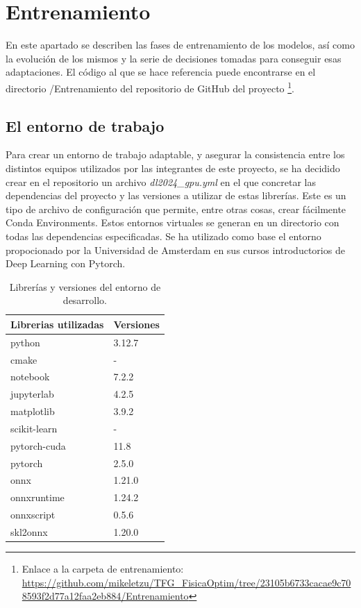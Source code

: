 \section{Entrenamiento}
\label{sec:EntrenamientoPython}

En este apartado se describen las fases de entrenamiento de los modelos, así como la evolución de los mismos y la serie de decisiones tomadas para conseguir esas adaptaciones. El código al que se hace referencia puede encontrarse en el directorio /Entrenamiento del repositorio de GitHub del proyecto \footnote{Enlace a la carpeta de entrenamiento: \url{https://github.com/mikeletzu/TFG_FisicaOptim/tree/23105b6733cacae9c708593f2d77a12faa2eb884/Entrenamiento}}. 

\subsection{El entorno de trabajo}

Para crear un entorno de trabajo adaptable, y asegurar la consistencia entre los distintos equipos utilizados por las integrantes de este proyecto, se ha decidido crear en el repositorio un archivo \textit{dl2024\_gpu.yml} en el que concretar las dependencias del proyecto y las versiones a utilizar de estas librerías. Este es un tipo de archivo de configuración que permite, entre otras cosas, crear fácilmente Conda Environments. Estos entornos virtuales se generan en un directorio con todas las dependencias especificadas. Se ha utilizado como base el entorno propocionado por la Universidad de Amsterdam en sus cursos introductorios de Deep Learning con Pytorch.
\begin{table}[H]
    \begin{center}
        \begin{tabular}{ | m{4cm} | m{2cm} | }
        \hline Librerias utilizadas & Versiones \\ \hline
            python & 3.12.7 \\ \hline
            cmake & - \\ \hline
            notebook & 7.2.2 \\ \hline 
            jupyterlab & 4.2.5 \\ \hline 
            matplotlib & 3.9.2 \\ \hline 
            scikit-learn & - \\ \hline
            pytorch-cuda & 11.8 \\ \hline
            pytorch & 2.5.0 \\ \hline
            onnx & 1.21.0 \\ \hline
            onnxruntime & 1.24.2 \\ \hline
            onnxscript & 0.5.6 \\ \hline
            skl2onnx & 1.20.0 \\ \hline
        \end{tabular}
    \end{center}
    \caption{Librerías y versiones del entorno de desarrollo.}
\end{table}


